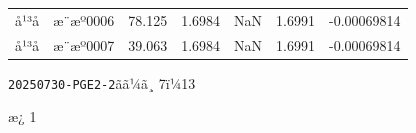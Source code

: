 \documentclass[UTF8,10pt,a4paper,fontset=fandol]{ctexart}
\newcommand{\fieldvalue}[1]{#1}
\begin{document}
\begin{center}
\begin{center}
\begin{tabularx}{\textwidth}{l l l l l l l}
å¹³å &
\fieldvalue{æ¨æº0006} &
\fieldvalue{78.125} &
\fieldvalue{1.6984} &
\fieldvalue{NaN} &
\fieldvalue{1.6991} &
\fieldvalue{-0.00069814} \\

å¹³å &
\fieldvalue{æ¨æº0007} &
\fieldvalue{39.063} &
\fieldvalue{1.6984} &
\fieldvalue{NaN} &
\fieldvalue{1.6991} &
\fieldvalue{-0.00069814}
\end{tabularx}
\normalsize

\newpage

\noindent\texttt{20250730-PGE2-2}\hfill ãã¼ã¸ 7ï¼13

\medskip
\noindent æ¿ 1


\end{center}
\end{center}
\end{document}
